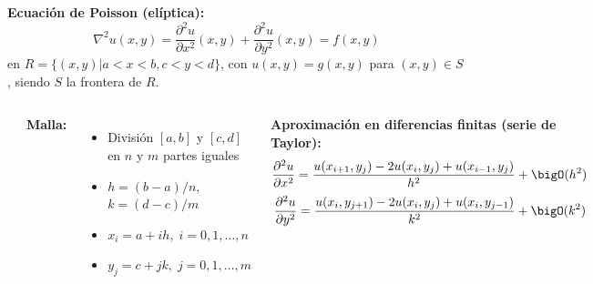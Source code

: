 \documentclass[9pt, aspectratio=169]{beamer}
\begin{document}
\begin{frame}
\textbf{Ecuación de Poisson (elíptica):}
\[ \nabla^2 u(x, y) = \frac{\partial^2 u}{\partial x^2}(x, y) + \frac{\partial^2 u}{\partial y^2}(x, y) = f(x, y) \]
en $R = \{(x, y) | a < x < b, c < y < d \}$, con $u(x, y) = g(x, y)$ para $(x, y) \in S$, siendo $S$ la frontera de $R$.
\begin{columns}
\cx
\begin{center}
    \includegraphics[scale=0.8]{figs/malla-01.pdf}
\end{center}
\cx
\textbf{Malla:}
\begin{itemize}
    \item División $[a, b]$ y $[c, d]$ en $n$ y $m$ partes iguales
    \item $h = (b - a) / n$, $k = (d - c) / m$
    \item $x_i = a + i h, \; i = 0, 1, \ldots, n$
    \item $y_j = c + j k, \; j = 0, 1, \ldots, m$
\end{itemize}

\textbf{Aproximación en diferencias finitas (serie de Taylor):}
\[ \frac{\partial^2 u}{\partial x^2} = \frac{u(x_{i+1}, y_j) - 2 u(x_i, y_j) + u(x_{i-1},y_j)}{h^2} + \bigO(h^2) \]
\[ \frac{\partial^2 u}{\partial y^2} = \frac{u(x_i, y_{j+1}) - 2 u(x_i, y_j) + u(x_i,y_{j-1})}{k^2} + \bigO(k^2) \]
\end{columns}
\end{frame}
\end{document}
